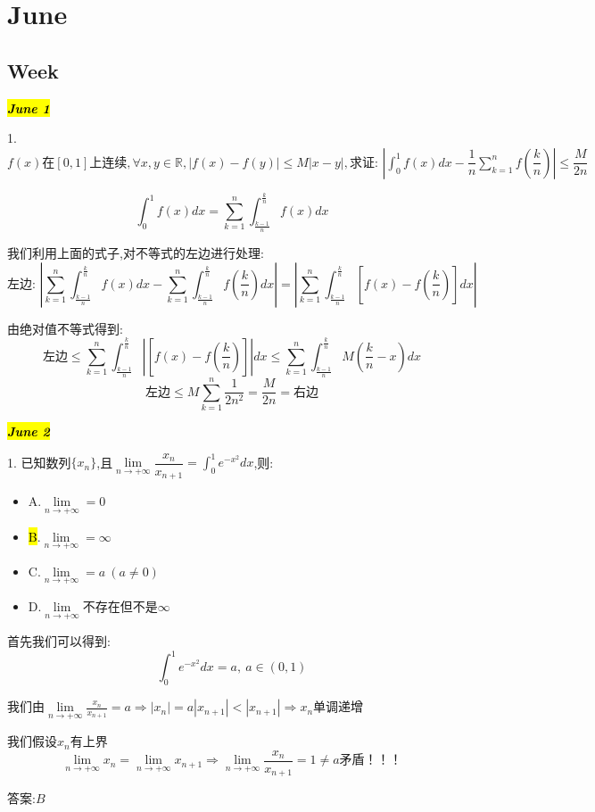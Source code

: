 \chapter{June}
\section{Week }
\hl{\textbf{\textit{June 1}}}

1. $f(x)\text{在}[0,1]\text{上连续},\forall x,y\in \mathbb{R} ,|f(x)-f(y)|\leq M|x-y|,\text{求证: }\left| \int_{0}^{1}f(x)dx-\dfrac{1}{n}\sum\limits_{k=1}^{n}f(\dfrac{k}{n})\right|\leq \dfrac{M}{2n} $
\begin{solution}
	\begin{lemma}[积分和求和]
		
		$$\int_{0}^{1}f(x)dx=\sum\limits_{k=1}^{n}\int_{\frac{k-1}{n}}^{\frac{k}{n}}f(x)dx$$
	\end{lemma}
	我们利用上面的式子,对不等式的左边进行处理: 
	$$\text{左边: }\left| \sum\limits_{k=1}^{n}\int_{\frac{k-1}{n}}^{\frac{k}{n}}f(x)dx-\sum\limits_{k=1}^{n}\int_{\frac{k-1}{n}}^{\frac{k}{n}}f(\frac{k}{n})dx\right|=\left|\sum\limits_{k=1}^{n}\int_{\frac{k-1}{n}}^{\frac{k}{n}}[f(x)-f(\frac{k}{n})]dx\right|$$
	
	由绝对值不等式得到: 
	$$\text{左边}\leq \sum\limits_{k=1}^{n}\int_{\frac{k-1}{n}}^{\frac{k}{n}}\left|  [f(x)-f(\frac{k}{n})]\right|dx\leq  \sum\limits_{k=1}^{n}\int_{\frac{k-1}{n}}^{\frac{k}{n}}M(\frac{k}{n}-x)dx$$
	$$\text{左边}\leq M\sum\limits_{k=1}^{n}\frac{1}{2n^2}=\dfrac{M}{2n}=\text{右边} $$
\end{solution}


\hl{\textbf{\textit{June 2}}}

1. 已知数列$\{x_{n}\}$,且$\lim\limits_{n\rightarrow +\infty}\dfrac{x_{n}}{x_{n+1}}=\int_{0}^{1}e^{-x^2}dx$,则: 

\begin{itemize}
	\item A.$\lim\limits_{n\rightarrow +\infty}=0$
	\item \hl{B}.$\lim\limits_{n\rightarrow +\infty}=\infty$
	\item C.$\lim\limits_{n\rightarrow +\infty}=a\ (a\neq 0)$
	\item D.$\lim\limits_{n\rightarrow +\infty}\text{不存在但不是}\infty$
\end{itemize}
\begin{solution}
	
	首先我们可以得到: 
	$$\int_{0}^{1}e^{-x^2}dx=a,\ a\in(0,1)$$
	
	我们由$\lim\limits_{n\rightarrow +\infty}\frac{x_{n}}{x_{n+1}}=a\Rightarrow |x_{n}|=a|x_{n+1}|<|x_{n+1}|\Rightarrow x_{n}\text{单调递增}$
	
	我们假设$x_{n}$有上界
	$$\lim\limits_{n\rightarrow +\infty}x_{n}=\lim\limits_{n\rightarrow +\infty}x_{n+1}\Rightarrow \lim\limits_{n\rightarrow +\infty}\frac{x_{n}}{x_{n+1}}=1\neq a\text{矛盾！！！}$$
	
	答案:$B$
\end{solution}

